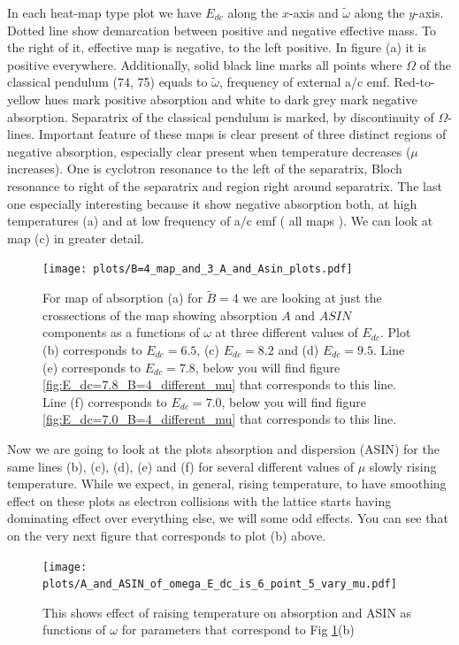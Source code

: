 \documentclass[40pt,letterpaper,physrev]{article}
\begin{document}
	In each heat-map type plot we have $E_{dc}$ along the $x$-axis and $\tilde{\omega}$ along the $y$-axis. 
	Dotted line show demarcation between positive and negative effective mass. To the right of it, effective map is
	negative, to the left positive. In figure (a) it is positive everywhere. Additionally, solid black line marks all
	points where $\Omega$ of the classical pendulum (74, 75) equals to $\tilde{\omega}$, frequency of external a/c emf.
	Red-to-yellow hues mark positive absorption and white to dark grey mark negative absorption. Separatrix of the
	classical pendulum is marked, by discontinuity of $\Omega$-lines. Important feature of these maps is clear present 
	of three distinct regions of negative absorption, especially clear present when temperature decreases 
	($\mu$ increases). One is cyclotron resonance to the left of the separatrix, Bloch resonance to right of the
	separatrix and region right around separatrix. The last one especially interesting because it show negative
	absorption both, at high temperatures (a) and at low frequency of a/c emf ( all maps ). We can look at map (c) in
	greater detail.
	\begin{figure}[H]
	  \centering
	  \normalsize %
	  \texttt{[image: plots/B=4\_map\_and\_3\_A\_and\_Asin\_plots.pdf]}
	  \caption{For map of absorption (a) for $\tilde{B}=4$ we are looking at just the crossections of the
	  map showing absorption $A$ and $ASIN$ components as a functions of $\omega$ at three different values of $E_{dc}$.
	  Plot (b) corresponds to $E_{dc}=6.5$, (c) $E_{dc}=8.2$ and (d) $E_{dc}=9.5$. Line (e) corresponds to $E_{dc}=7.8$, 
	  below you will find figure \ref{fig:E_dc=7.8_B=4_different_mu} that corresponds to this line. Line (f) 
	  corresponds to $E_{dc}=7.0$, below you will find figure \ref{fig:E_dc=7.0_B=4_different_mu} that corresponds to this line.}
	  \label{fig:map_of_absorption_and_profiles_for_three_different_E_dc_B=4}
	\end{figure}
	Now we are going to look at the plots absorption and dispersion (ASIN) for the same lines (b), (c), (d), (e) and (f)
for several different values of $\mu$ slowly rising temperature. While we expect, in general, rising temperature, to have
smoothing effect on these plots as electron collisions with the lattice starts having dominating effect over everything
else, we will some odd effects. You can see that on the very next figure that corresponds to plot (b) above.
	\begin{figure}[H]
	  \centering
	  \normalsize %
	  \texttt{[image: plots/A\_and\_ASIN\_of\_omega\_E\_dc\_is\_6\_point\_5\_vary\_mu.pdf]}
	  \caption{This shows effect of raising temperature on absorption and ASIN as functions of $\omega$ for 
	  parameters that correspond to Fig \ref{fig:map_of_absorption_and_profiles_for_three_different_E_dc_B=4}(b)}
	  \label{fig:E_dc=6.5_B=4_different_mu}	  
	\end{figure}
\end{document}
